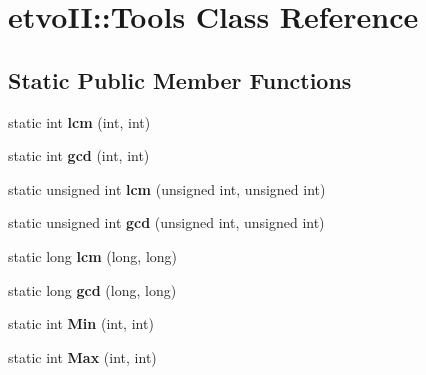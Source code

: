 \hypertarget{classetvo_i_i_1_1_tools}{}\section{etvo\+II\+:\+:Tools Class Reference}
\label{classetvo_i_i_1_1_tools}
\subsection*{Static Public Member Functions}
\begin{DoxyCompactItemize}
\item 
\mbox{\label{classetvo_i_i_1_1_tools_afe900bed880579e3439aad60b179365e}} 
static int {\bfseries lcm} (int, int)
\item 
\mbox{\label{classetvo_i_i_1_1_tools_a1cca712c5d379dcb3ebd3caacff219d9}} 
static int {\bfseries gcd} (int, int)
\item 
\mbox{\label{classetvo_i_i_1_1_tools_a1241a59c1ec3125a4f5cf05f3a5fcba9}} 
static unsigned int {\bfseries lcm} (unsigned int, unsigned int)
\item 
\mbox{\label{classetvo_i_i_1_1_tools_aa0cdec81aa5fab0a1c1cc01101959f6d}} 
static unsigned int {\bfseries gcd} (unsigned int, unsigned int)
\item 
\mbox{\label{classetvo_i_i_1_1_tools_a0699e3815842351c50858ba6d1609848}} 
static long {\bfseries lcm} (long, long)
\item 
\mbox{\label{classetvo_i_i_1_1_tools_a8a673a175d58e5c15cc6f6611d3da8f0}} 
static long {\bfseries gcd} (long, long)
\item 
\mbox{\label{classetvo_i_i_1_1_tools_a4cd6778ee5ca8ce34d2dffc2f98b3568}} 
static int {\bfseries Min} (int, int)
\item 
\mbox{\label{classetvo_i_i_1_1_tools_a8413c630d217de2178bcfe68eed26702}} 
static int {\bfseries Max} (int, int)
\item 
\mbox{\label{classetvo_i_i_1_1_tools_aeaca628f61f5324f8a092ea7c42bcc82}} 

\end{DoxyCompactItemize}
